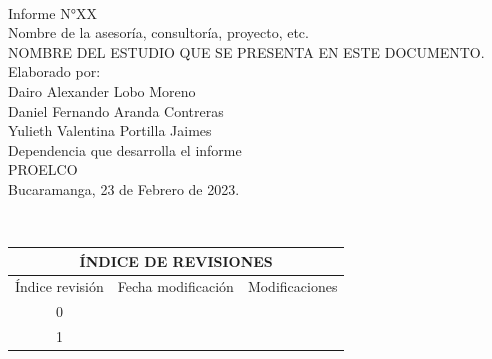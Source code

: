 \documentclass[12pt]{article}
\begin{document}
\begin{center}
\phantom{This text will be invisible} \\
\vspace{1.5cm}
Informe N°XX\\
Nombre de la asesoría, consultoría, proyecto, etc.\\
\vspace{4cm}
NOMBRE DEL ESTUDIO QUE SE PRESENTA EN ESTE DOCUMENTO.\\
\vspace{4cm}
Elaborado por:\\
Dairo Alexander Lobo Moreno\\
Daniel Fernando Aranda Contreras\\
Yulieth Valentina Portilla Jaimes\\

\vspace{4cm}
Dependencia que desarrolla el informe\\
PROELCO\\
Bucaramanga, 23 de Febrero de 2023.\\
\vspace{2cm}
\end{center}
\newpage
\phantom{This text will be invisible} \\

\begin{table}[h]
\centering
\begin{tabular}{|ccc|}
\hline
\multicolumn{3}{|c|}{ÍNDICE DE REVISIONES}                                                       \\ \hline
\multicolumn{1}{|c|}{Índice revisión} & \multicolumn{1}{c|}{Fecha modificación} & Modificaciones \\ \hline
\multicolumn{1}{|c|}{0}               & \multicolumn{1}{c|}{}                   &                \\ \hline
\multicolumn{1}{|c|}{1}               & \multicolumn{1}{c|}{}                   &                \\ \hline
\end{tabular}
\end{table}
\end{document}
